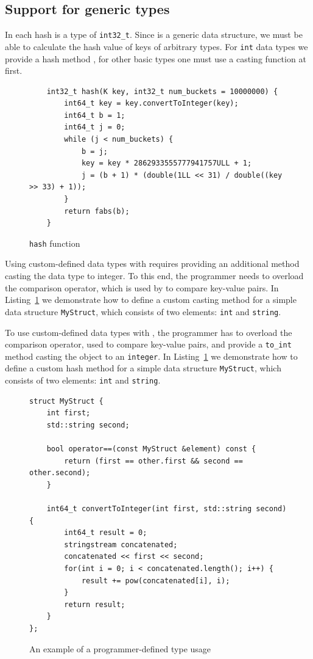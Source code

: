 \subsection{Support for generic types} 

    In \NvmHashMap each hash is a type of \texttt{int32\_t}. 
    Since \NvmHashMap is a generic data structure, we must be able to calculate the hash value of keys of arbitrary types.
    For \texttt{int} data types we provide a hash method \cite{Hashing}, for other basic types one must use a casting function at first. 
    
    \begin{figure}[ht]
\renewcommand{\figurename}{Listing}
\begin{lstlisting}
    int32_t hash(K key, int32_t num_buckets = 10000000) {
        int64_t key = key.convertToInteger(key);
        int64_t b = 1;
        int64_t j = 0;
        while (j < num_buckets) {
            b = j;
            key = key * 2862933555777941757ULL + 1;
            j = (b + 1) * (double(1LL << 31) / double((key >> 33) + 1));
        }
        return fabs(b);
    }
\end{lstlisting}
\caption{\texttt{hash} function}
\end{figure}

    Using custom-defined data types with \NvmHashMap requires providing an additional method casting the data type to integer.
    To this end, the programmer needs to overload the comparison operator, which is used by \NvmHashMap to compare key-value pairs. 
    In Listing~\ref{StdHashOverload} we demonstrate how to define a custom casting method for a simple data structure \texttt{MyStruct}, which consists of two elements: \texttt{int} and \texttt{string}. 
    
    To use custom-defined data types with \NvmHashMap, the programmer has to overload the comparison operator, used to compare key-value pairs, and provide a \texttt{to\_int} method casting the object to an \texttt{integer}. 
    In Listing~\ref{StdHashOverload} we demonstrate how to define a custom hash method for a simple data structure \texttt{MyStruct}, which consists of two elements: \texttt{int} and \texttt{string}. 
    
\begin{figure}[ht]
\renewcommand{\figurename}{Listing}
\begin{lstlisting}
struct MyStruct {
    int first;
    std::string second;
    
    bool operator==(const MyStruct &element) const {
        return (first == other.first && second == other.second);
    }
    
    int64_t convertToInteger(int first, std::string second) {
        int64_t result = 0;
        stringstream concatenated;
        concatenated << first << second;
        for(int i = 0; i < concatenated.length(); i++) {
            result += pow(concatenated[i], i);
        }
        return result;
    }
};
\end{lstlisting}
\caption{An example of a programmer-defined type usage}
\label{StdHashOverload}
\end{figure}

